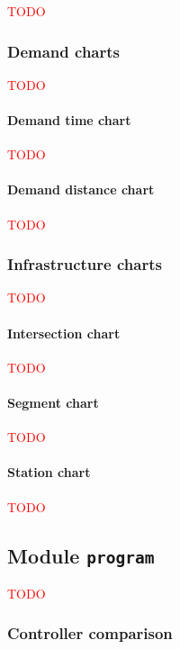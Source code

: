 \documentclass[10pt,twocolumn]{article}
\begin{document}
\textcolor{red}{TODO}

\subsubsection{Demand charts}

\textcolor{red}{TODO}

\paragraph{Demand time chart}

\textcolor{red}{TODO}

\paragraph{Demand distance chart}

\textcolor{red}{TODO}

\subsubsection{Infrastructure charts}

\textcolor{red}{TODO}

\paragraph{Intersection chart}

\textcolor{red}{TODO}

\paragraph{Segment chart}

\textcolor{red}{TODO}

\paragraph{Station chart}

\textcolor{red}{TODO}

\subsection{Module \texttt{program}}
\label{sec:application}

\textcolor{red}{TODO}

\subsubsection{Controller comparison}
\label{sec:controller-comparison}
\end{document}
